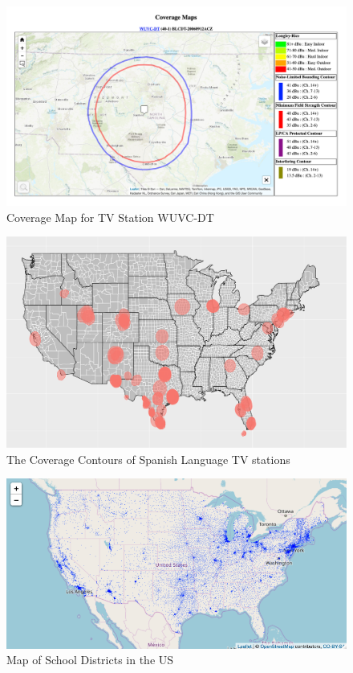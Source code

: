 \documentclass[11pt]{article}
\begin{document}
\begin{figure}[!hbtp]
\centering
\caption{Coverage Map for TV Station WUVC-DT}\label{f:contour_example}
\includegraphics[width=14.5cm]{../../analysis/Output/img/ContourExample.png}
\end{figure} 

\begin{figure}[!hbtp]
\centering
\caption{The Coverage Contours of Spanish Language TV stations}\label{f:all_contours}
\includegraphics[width=14.5cm]{../../analysis/Output/img/SpanishContours_pretty.pdf}
\end{figure} 

\begin{figure}[!hbtp]
\centering
\caption{Map of School Districts in the US}\label{schooldistrictfig}
\includegraphics[width=12cm]{../../analysis/Output/img/LEAMap.png}
\end{figure} 
\end{document}
